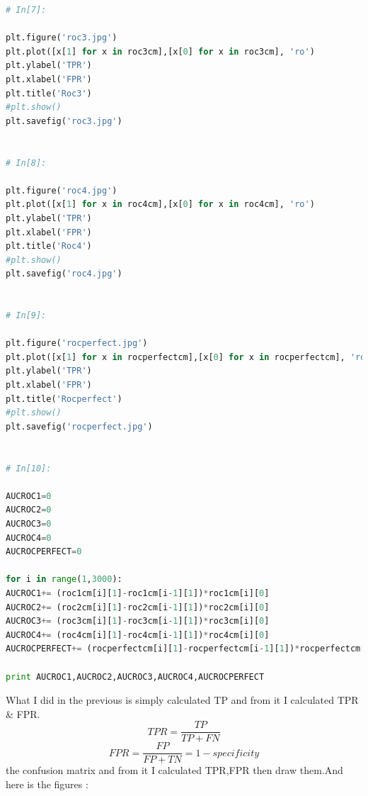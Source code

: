 \documentclass{article}
\begin{document}
\begin{lstlisting}[language=Python]
# In[7]:

plt.figure('roc3.jpg')
plt.plot([x[1] for x in roc3cm],[x[0] for x in roc3cm], 'ro')
plt.ylabel('TPR')
plt.xlabel('FPR')
plt.title('Roc3')
#plt.show()
plt.savefig('roc3.jpg')


# In[8]:

plt.figure('roc4.jpg')
plt.plot([x[1] for x in roc4cm],[x[0] for x in roc4cm], 'ro')
plt.ylabel('TPR')
plt.xlabel('FPR')
plt.title('Roc4')
#plt.show()
plt.savefig('roc4.jpg')


# In[9]:

plt.figure('rocperfect.jpg')
plt.plot([x[1] for x in rocperfectcm],[x[0] for x in rocperfectcm], 'ro')
plt.ylabel('TPR')
plt.xlabel('FPR')
plt.title('Rocperfect')
#plt.show()
plt.savefig('rocperfect.jpg')


# In[10]:

AUCROC1=0
AUCROC2=0
AUCROC3=0
AUCROC4=0
AUCROCPERFECT=0

for i in range(1,3000):
AUCROC1+= (roc1cm[i][1]-roc1cm[i-1][1])*roc1cm[i][0]
AUCROC2+= (roc2cm[i][1]-roc2cm[i-1][1])*roc2cm[i][0]
AUCROC3+= (roc3cm[i][1]-roc3cm[i-1][1])*roc3cm[i][0]
AUCROC4+= (roc4cm[i][1]-roc4cm[i-1][1])*roc4cm[i][0]
AUCROCPERFECT+= (rocperfectcm[i][1]-rocperfectcm[i-1][1])*rocperfectcm[i][0]

print AUCROC1,AUCROC2,AUCROC3,AUCROC4,AUCROCPERFECT
\end{lstlisting}
What  I did in the previous is simply calculated TP and from it I calculated TPR \& FPR.
\[TPR = \frac{TP}{TP+FN}\]
\[FPR = \frac{FP}{FP+TN} = 1 - specificity \]
 the confusion matrix and from it I calculated TPR,FPR then draw them.And here is the figures :\\
\end{document}

